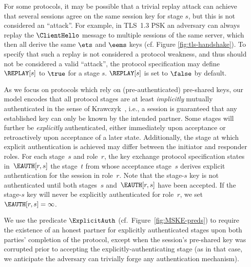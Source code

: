 For some protocols, it may be possible that a trivial replay attack can achieve that several sessions agree on the same session key for stage $s$, but this is not considered an ``attack''.
For example, in TLS~1.3 PSK an adversary can always replay the $\ClientHello$ message to multiple sessions of the same server, which then all derive the same $\ets$ and $\eems$ keys (cf. Figure \ref{fig:tls-handshake}).
%
To specify that such a replay is not considered a protocol weakness, and thus should not be considered a valid ``attack'', the protocol specification may define $\REPLAY[s]$ to $\true$ for a stage $s$. $\REPLAY[s]$ is set to $\false$ by default. 

As we focus on protocols which rely on (pre-authenticated) pre-shared keys,
our model encodes that all protocol stages are at least \emph{implicitly} mutually authenticated in the sense of Krawczyk~\cite{EPRINT:Krawczyk05},
i.e., a session is guaranteed that any established key can only be known by the intended partner.
Some stages will further be \emph{explicitly} authenticated, either immediately upon acceptance or retroactively upon acceptance of a later state. 
Additionally, the stage at which explicit authentication is achieved may differ between the initiator and responder roles.
For each stage~$s$ and role~$r$, the key exchange protocol specification states in~$\EAUTH[r, s]$ the stage~$t$ from whose acceptance stage~$s$ derives explicit authentication for the session in role~$r$.
Note that the stage-$s$ key is not authenticated until both stages~$s$ and~$\EAUTH[r, s]$ have been accepted. 
If the stage-$s$ key will never be explicitly authenticated for role~$r$, we set $\EAUTH[r,s] = \infty$.

We use the predicate $\ExplicitAuth$ (cf.\ Figure~\ref{fig:MSKE-preds}) to require the existence of an honest partner for explicitly authenticated stages upon both parties' completion of the protocol, except when the session's pre-shared key was corrupted prior to accepting the explicitly-authenticating stage
(as in that case, we anticipate the adversary can trivially forge any authentication mechanism).

